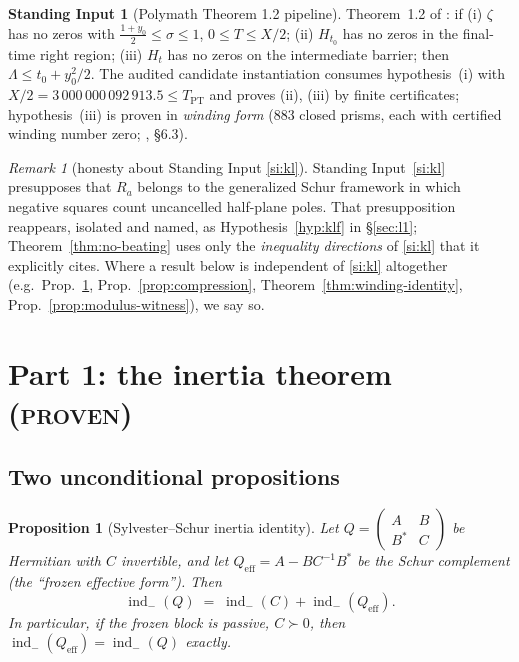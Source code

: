 \documentclass[11pt]{article}
\newtheorem{proposition}[theorem]{Proposition}
\theoremstyle{definition}
\newtheorem{standing}[theorem]{Standing Input}
\theoremstyle{remark}
\newtheorem{remark}[theorem]{Remark}
\newcommand{\indm}{\operatorname{ind}_{-}}
\newcommand{\TPT}{T_{\mathrm{PT}}}
\begin{document}
\begin{standing}[Polymath Theorem 1.2 pipeline]\label{si:polymath}
Theorem~1.2 of \cite{Polymath15}: if (i) $\zeta$ has no zeros with
$\frac{1+y_0}{2}\le\sigma\le1$, $0\le T\le X/2$; (ii) $H_{t_0}$ has no zeros
in the final-time right region; (iii) $H_t$ has no zeros on the intermediate
barrier; then $\Lambda\le t_0+y_0^2/2$. The audited candidate instantiation
\cite{ProofNote} consumes hypothesis~(i) with $X/2=3\,000\,000\,092\,913.5\le\TPT$
and proves (ii), (iii) by finite certificates; hypothesis~(iii) is proven in
\emph{winding form} (883 closed prisms, each with certified winding number
zero; \cite{BarrierCert}, \S6.3).
\end{standing}

\begin{remark}[honesty about Standing Input \ref{si:kl}]\label{rem:kl-honesty}
Standing Input~\ref{si:kl} presupposes that $R_a$ belongs to the generalized
Schur framework in which negative squares count uncancelled half-plane poles.
That presupposition reappears, isolated and named, as
Hypothesis~\ref{hyp:klf} in \S\ref{sec:l1}; Theorem~\ref{thm:no-beating} uses
only the \emph{inequality directions} of \ref{si:kl} that it explicitly cites.
Where a result below is independent of \ref{si:kl} altogether (e.g.\
Prop.~\ref{prop:sylvester}, Prop.~\ref{prop:compression},
Theorem~\ref{thm:winding-identity}, Prop.~\ref{prop:modulus-witness}), we say
so.
\end{remark}

\section{Part 1: the inertia theorem (\textsc{proven})}\label{sec:inertia}

\subsection{Two unconditional propositions}

\begin{proposition}[Sylvester--Schur inertia identity]\label{prop:sylvester}
Let $Q=\begin{pmatrix}A&B\\ B^{*}&C\end{pmatrix}$ be Hermitian with $C$
invertible, and let $Q_{\mathrm{eff}}=A-BC^{-1}B^{*}$ be the Schur complement
(the ``frozen effective form''). Then
\[
\indm(Q)\;=\;\indm(C)+\indm(Q_{\mathrm{eff}}).
\]
In particular, if the frozen block is \emph{passive}, $C\succ0$, then
$\indm(Q_{\mathrm{eff}})=\indm(Q)$ exactly.
\end{proposition}
\end{document}
